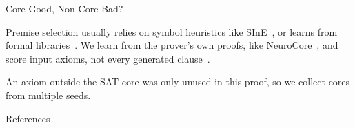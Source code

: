 \begin{minipage}[t][1266pt][t]{\textwidth}
	\begin{exampleblock}{Core Good, Non-Core Bad?}
		\Large
		\vspace{14pt}

		Premise selection usually relies on symbol heuristics like SInE~\cite{hoder2011sine}, or learns from formal libraries~\cite{wang2017premise}.
		We learn from the prover's own proofs, like NeuroCore~\cite{guidinghighperformance}, and score input axioms, not every generated clause~\cite{chvalovsky2026vampire}.

		An axiom outside the SAT core was only unused in this proof, so we collect cores from multiple seeds.

		{\par}
	\end{exampleblock}

	\vfill

	\begin{block}{References}
		\renewcommand{\bibsection}{}
		\vspace{-8pt}
		{\fontsize{22pt}{26pt}\selectfont}
	\end{block}
\end{minipage}
